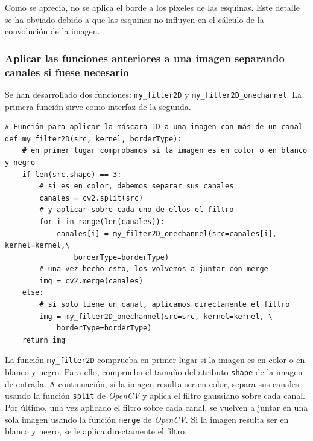 \documentclass[11pt,a4paper]{article}
\theoremstyle{plain}
\theoremstyle{definition}
\begin{document}
Como se aprecia, no se aplica el borde a los píxeles de las esquinas. Este detalle se ha obviado debido a que las esquinas no influyen en el cálculo de la convolución de la imagen.


\subsubsection{Aplicar las funciones anteriores a una imagen separando canales si fuese necesario}\label{sec:conv2D}

Se han desarrollado dos funciones: \texttt{my\_filter2D} y \texttt{my\_filter2D\_onechannel}. La primera función sirve como interfaz de la segunda.

\begin{verbatim}
# Función para aplicar la máscara 1D a una imagen con más de un canal
def my_filter2D(src, kernel, borderType):
    # en primer lugar comprobamos si la imagen es en color o en blanco y negro
    if len(src.shape) == 3:
        # si es en color, debemos separar sus canales
        canales = cv2.split(src)
        # y aplicar sobre cada uno de ellos el filtro
        for i in range(len(canales)):
            canales[i] = my_filter2D_onechannel(src=canales[i], kernel=kernel,\
                borderType=borderType)
        # una vez hecho esto, los volvemos a juntar con merge
        img = cv2.merge(canales)
    else:
        # si solo tiene un canal, aplicamos directamente el filtro
        img = my_filter2D_onechannel(src=src, kernel=kernel, \
            borderType=borderType)
    return img
\end{verbatim}

La función \texttt{my\_filter2D} comprueba en primer lugar si la imagen es en color o en blanco y negro. Para ello, comprueba el tamaño del atributo \texttt{shape} de la imagen de entrada. A continuación, si la imagen resulta ser en color, separa sus canales usando la función \texttt{split} de \textit{OpenCV} y aplica el filtro gaussiano sobre cada canal. Por último, una vez aplicado el filtro sobre cada canal, se vuelven a juntar en una sola imagen usando la función \texttt{merge} de \textit{OpenCV}. Si la imagen resulta ser en blanco y negro, se le aplica directamente el filtro.
\end{document}
